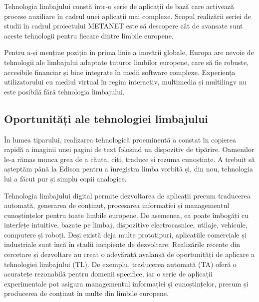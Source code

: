 \begin{multicols}{2}
Tehnologia limbajului constă într-o serie de aplicații de bază care activează procese auxiliare în cadrul unei aplicații mai complexe. Scopul realizării seriei de studii în cadrul proiectului METANET este să descopere cât de avansate sunt aceste tehnologii pentru fiecare dintre limbile europene. 


Pentru a-și menține poziția în prima linie a inovării globale, Europa are nevoie de tehnologii ale limbajului adaptate tuturor limbilor europene, care să fie robuste, accesibile financiar și bine integrate în medii software complexe. Experiența utilizatorului cu mediul virtual în regim interactiv, multimedia și multilingv nu este posibilă fără tehnologia limbajului.

\subsection{Oportunități ale tehnologiei limbajului}

În lumea tiparului, realizarea tehnologică proeminentă a constat în copierea rapidă a imaginii unei pagini de text folosind un dispozitiv de tipărire. Oamenilor le-a rămas munca grea de a căuta, citi, traduce și rezuma cunoștințe. A trebuit să așteptăm până la Edison pentru a înregistra limba vorbită și, din nou, tehnologia lui a făcut pur și simplu copii analogice.

Tehnologia limbajului digital permite dezvoltarea de aplicații precum traducerea automată, generarea de conținut, procesarea informației și managementul cunoștințelor pentru toate limbile europene. De asemenea, ea poate îmbogăți cu interfețe intuitive, bazate pe limbaj, dispozitive electrocasnice, utilaje, vehicule, computere și roboți. Deși există deja multe prototipuri, aplicațiile comerciale și industriale sunt încă în stadii incipiente de dezvoltare. Realizările recente din cercetare și dezvoltare au creat o adevărată avalanșă de oportunități de aplicare a tehnologiei limbajului (TL). De exemplu, traducerea automată (TA) oferă o acuratețe rezonabilă pentru domenii specifice, iar o serie de aplicații experimentale pot asigura managementul informației și cunoștințelor, precum și producerea de conținut în multe din limbile europene. 


\end{multicols}
